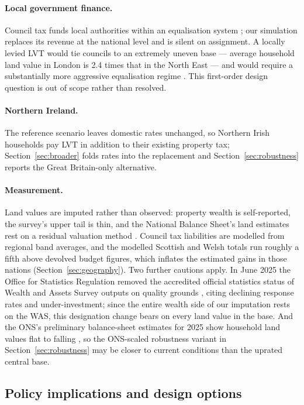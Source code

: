 \paragraph{Local government finance.} Council tax funds local authorities within an equalisation system \citep{aminsmith2019}; our simulation replaces its revenue at the national level and is silent on assignment. A locally levied LVT would tie councils to an extremely uneven base --- average household land value in London is 2.4 times that in the North East --- and would require a substantially more aggressive equalisation regime \citep{scotgov2015}. This first-order design question is out of scope rather than resolved.

\paragraph{Northern Ireland.} The reference scenario leaves domestic rates unchanged, so Northern Irish households pay LVT in addition to their existing property tax; Section~\ref{sec:broader} folds rates into the replacement and Section~\ref{sec:robustness} reports the Great Britain-only alternative.

\paragraph{Measurement.} Land values are imputed rather than observed: property wealth is self-reported, the survey's upper tail is thin, and the National Balance Sheet's land estimates rest on a residual valuation method \citep{ons2025}. Council tax liabilities are modelled from regional band averages, and the modelled Scottish and Welsh totals run roughly a fifth above devolved budget figures, which inflates the estimated gains in those nations (Section~\ref{sec:geography}). Two further cautions apply. In June 2025 the Office for Statistics Regulation removed the accredited official statistics status of Wealth and Assets Survey outputs on quality grounds \citep{osr2025}, citing declining response rates and under-investment; since the entire wealth side of our imputation rests on the WAS, this designation change bears on every land value in the base. And the ONS's preliminary balance-sheet estimates for 2025 show household land values flat to falling \citep{ons2026prelim}, so the ONS-scaled robustness variant in Section~\ref{sec:robustness} may be closer to current conditions than the uprated central base.

\subsection{Policy implications and design options}


